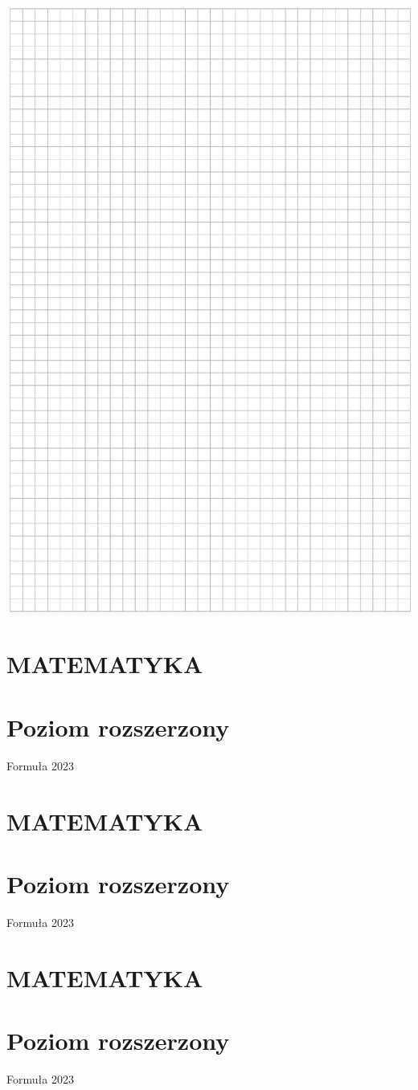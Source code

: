 \documentclass[10pt]{article}
\begin{document}
\includegraphics[max width=\textwidth, center]{2024_11_21_f1ecc00f5c4ab21f0d04g-27}

\section*{MATEMATYKA}
\section*{Poziom rozszerzony}
Formuła 2023

\section*{MATEMATYKA}
\section*{Poziom rozszerzony}
Formuła 2023

\section*{MATEMATYKA}
\section*{Poziom rozszerzony}
Formuła 2023
\end{document}
